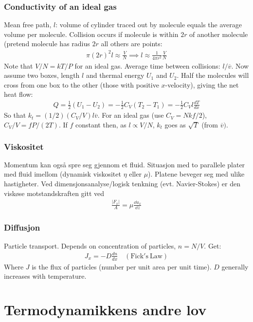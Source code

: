 \documentclass[12pt]{article}
\begin{document}
\subsubsection{Conductivity of an ideal gas}
Mean free path, $l$: volume of cylinder traced out by molecule equals the average volume per molecule. Collision occurs if molecule is within $2r$ of another molecule (pretend molecule has radius $2r$ all others are points:
\begin{align*}
\pi(2r)^2 l \approx \frac{V}{N} \implies l\approx \frac{1}{4\pi r^2}\frac{V}{N}
\end{align*}
Note that $V/N=kT/P$ for an ideal gas. Average time between collisions: $l/\overline{v}$. Now assume two boxes, length $l$ and thermal energy $U_1$ and $U_2$. Half the molecules will cross from one box to the other (those with positive $x$-velocity), giving the net heat flow:
\begin{align*}
Q=\frac{1}{2}(U_1-U_2)=-\frac{1}{2}C_V(T_2-T_1)=-\frac{1}{2}C_Vl\frac{dT}{dx}
\end{align*}
So that $k_t=(1/2)(C_V/V)l \overline{v}$. For an ideal gas (use $C_V=Nkf/2$), $C_V/V=fP/(2T)$. If $f$ constant then, as $l\propto V/N$, $k_t$ goes as $\sqrt{T}$ (from $\overline{v})$.
\subsubsection{Viskositet}
Momentum kan også spre seg gjennom et fluid. Situasjon med to parallele plater
med fluid imellom (dynamisk viskositet $\eta$ eller $\mu$). Platene beveger seg med ulike hastigheter.
Ved dimensjonsanalyse/logisk tenkning (evt. Navier-Stokes) er den viskøse motstandskraften
gitt ved
\begin{align*}
  \frac{|F_x|}{A} = \mu \frac{\dd u_x}{\dd z}
\end{align*}
\subsubsection{Diffusjon}
Particle transport. Depends on concentration of particles, $n=N/V$. Get:
\begin{align*}
J_x=-D\frac{dn}{dx} \quad (\mathrm{Fick's\ Law})
\end{align*}
Where $J$ is the flux of particles (number per unit area per unit time). $D$ generally increases with temperature.
\section{Termodynamikkens andre lov}
\end{document}
